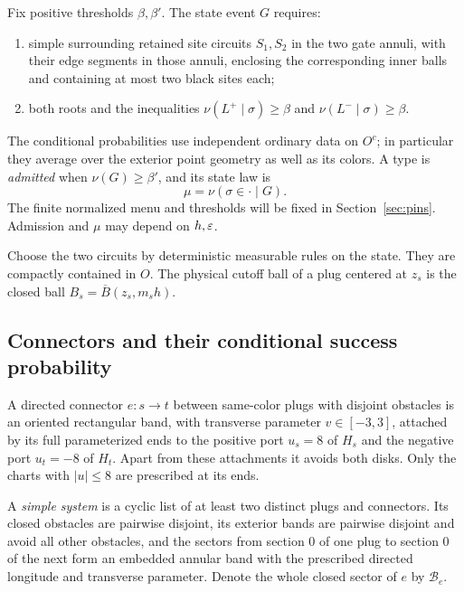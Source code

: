 \begin{definition}\label{def:usable-state}
Fix positive thresholds $\beta,\beta'$.  The state event $G$ requires:
\begin{enumerate}[label=\textup{(\roman*)}]
\item simple surrounding retained site circuits $S_1,S_2$ in the two gate
annuli, with their edge segments in those annuli, enclosing the
corresponding inner balls and containing at most two black sites each;
\item both roots and the inequalities
$\nu(L^+\mid\sigma)\ge\beta$ and
$\nu(L^-\mid\sigma)\ge\beta$.
\end{enumerate}
The conditional probabilities use independent ordinary data on $O^c$;
in particular they average over the exterior point geometry as well as
its colors.  A type is \emph{admitted} when $\nu(G)\ge\beta'$, and its
state law is
\[
 \mu=\nu(\sigma\in\cdot\mid G).
\]
The finite normalized menu and thresholds will be fixed in
Section~\ref{sec:pins}.  Admission and $\mu$ may depend on $h,\varepsilon$.
\end{definition}

Choose the two circuits by deterministic measurable rules on the state.
They are compactly contained in $O$.  The physical cutoff ball of a plug
centered at $z_s$ is the closed ball $B_s=\overline B(z_s,m_sh)$.

\subsection{Connectors and their conditional success probability}

\begin{definition}\label{def:simple-system}
A directed connector $e:s\to t$ between same-color plugs with disjoint
obstacles is an oriented rectangular band, with transverse parameter
$v\in[-3,3]$, attached by its full parameterized ends to the positive
port $u_s=8$ of $H_s$ and the negative port $u_t=-8$ of $H_t$.  Apart from
these attachments it avoids both disks.  Only the charts with $|u|\le8$
are prescribed at its ends.

A \emph{simple system} is a cyclic list of at least two distinct plugs
and connectors.  Its closed obstacles are pairwise disjoint, its exterior
bands are pairwise disjoint and avoid all other obstacles, and the
sectors from section $0$ of one plug to section $0$ of the next form an
embedded annular band with the prescribed directed longitude and
transverse parameter.  Denote the whole closed sector of $e$ by
$\mathcal B_e$.
\end{definition}

